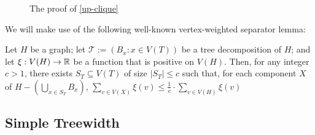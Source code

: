\documentclass[kpfonts]{patmorin}
\theoremstyle{named}
\begin{document}
\begin{figure}
    \caption{The proof of \cref{up-clique}}
    \label{up-clique-figure}
\end{figure}

We will make use of the following well-known vertex-weighted separator lemma:

\begin{lem}\label{weighted-separator}
    Let $H$ be a graph; let $\mathcal{T}:=(B_x:x\in V(T))$ be a tree decomposition of $H$; and let $\xi:V(H)\to\mathbb{R}$ be a function that is positive on $V(H)$.  Then, for any integer $c>1$, there exists $S_T\subseteq V(T)$ of size $|S_T|\le c$ such that, for each component $X$ of $H-(\bigcup_{x\in S_T} B_x)$, $\sum_{v\in V(X)} \xi(v) \le \tfrac{1}{c}\cdot\sum_{v\in V(H)} \xi(v)$
\end{lem}

%

\subsection{Simple Treewidth}
\end{document}
